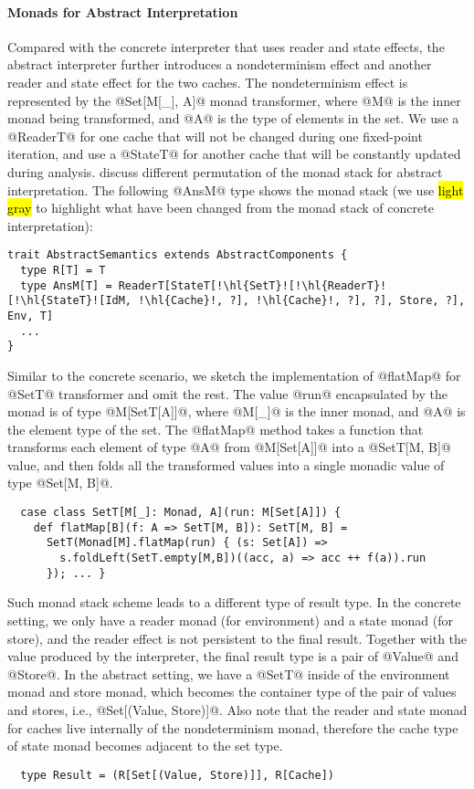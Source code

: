 \paragraph{Monads for Abstract Interpretation} Compared with the concrete
interpreter that uses reader and state effects, the abstract interpreter
further introduces a nondeterminism effect and another reader and state effect
for the two caches. The nondeterminism effect is represented by the
@Set[M[_], A]@ monad transformer, where @M@ is the inner monad being
transformed, and @A@ is the type of elements in the set. We use a @ReaderT@ for
one cache that will not be changed during one fixed-point iteration, and use a
@StateT@ for another cache that will be constantly updated during analysis.
\citet{DBLP:journals/pacmpl/DaraisLNH17} discuss different permutation of the
monad stack for abstract interpretation. The following @AnsM@ type shows the
monad stack (we use \hl{light gray} to highlight what have been changed from
the monad stack of concrete interpretation):
\begin{lstlisting}[escapechar=!]
trait AbstractSemantics extends AbstractComponents {
  type R[T] = T
  type AnsM[T] = ReaderT[StateT[!\hl{SetT}![!\hl{ReaderT}![!\hl{StateT}![IdM, !\hl{Cache}!, ?], !\hl{Cache}!, ?], ?], Store, ?], Env, T]
  ...
}
\end{lstlisting}

Similar to the concrete scenario, we sketch the implementation of @flatMap@ for
@SetT@ transformer and omit the rest. The value @run@ encapsulated by the monad
is of type @M[SetT[A]]@, where @M[_]@ is the inner monad, and @A@ is the element
type of the set. The @flatMap@ method takes a function that transforms each
element of type @A@ from @M[Set[A]]@ into a @SetT[M, B]@ value, and then folds
all the transformed values into a single monadic value of type @Set[M, B]@.
\begin{lstlisting}
  case class SetT[M[_]: Monad, A](run: M[Set[A]]) {
    def flatMap[B](f: A => SetT[M, B]): SetT[M, B] =
      SetT(Monad[M].flatMap(run) { (s: Set[A]) =>
        s.foldLeft(SetT.empty[M,B])((acc, a) => acc ++ f(a)).run
      }); ... }
\end{lstlisting}

Such monad stack scheme leads to a different type of result type. In the concrete
setting, we only have a reader monad (for environment) and a state monad (for
store), and the reader effect is not persistent to the final result. Together
with the value produced by the interpreter, the final result type is a pair of
@Value@ and @Store@. In the abstract setting, we have a @SetT@ inside of the
environment monad and store monad, which becomes the container type of the pair
of values and stores, i.e., @Set[(Value, Store)]@. Also note that the reader and
state monad for caches live internally of the nondeterminism monad, therefore
the cache type of state monad becomes adjacent to the set type.
\begin{lstlisting}
  type Result = (R[Set[(Value, Store)]], R[Cache])
\end{lstlisting}

